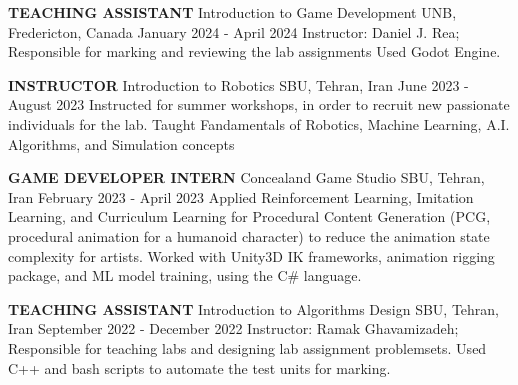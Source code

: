 \begin{cventries}
    \cventry
    {\textbf{TEACHING ASSISTANT}}
    {Introduction to Game Development}
    {UNB, Fredericton, Canada}
    {January 2024 - April 2024}
    {Instructor: Daniel J. Rea; Responsible for marking and reviewing the lab assignments \newline Used Godot Engine.}
    \vspace{0.4 cm}
\end{cventries}

\begin{cventries}
    \cventry
    {\textbf{INSTRUCTOR}}
    {Introduction to Robotics}
    {SBU, Tehran, Iran}
    {June 2023 - August 2023}
    {Instructed for summer workshops, in order to recruit new passionate individuals for the lab.
    \newline Taught Fandamentals of Robotics, Machine Learning, A.I. Algorithms, and Simulation concepts}
    \vspace{0.4 cm}
\end{cventries}

\begin{cventries}
    \cventry
    {\textbf{GAME DEVELOPER INTERN}}
    {Concealand Game Studio}
    {SBU, Tehran, Iran}
    {February 2023 - April 2023}
    {Applied Reinforcement Learning, Imitation Learning, and Curriculum Learning for Procedural Content Generation (PCG, procedural animation for a humanoid character) to reduce the animation state complexity for artists. 
    \newline Worked with Unity3D IK frameworks, animation rigging package, and ML model training, using the C\# language.}
\end{cventries}
\begin{cventries}
    \cventry
    {\textbf{TEACHING ASSISTANT}}
    {Introduction to Algorithms Design}
    {SBU, Tehran, Iran}
    {September 2022 - December 2022}
    {Instructor: Ramak Ghavamizadeh; Responsible for teaching labs and designing lab assignment problemsets.
    \newline Used C++ and bash scripts to automate the test units for marking.}
    \vspace{0.4 cm}
\end{cventries}

